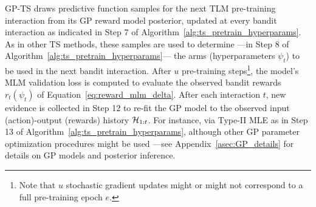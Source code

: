 GP-TS draws predictive function samples for the next TLM pre-training interaction
from its GP reward model posterior,
updated at every bandit interaction as indicated in Step 7 of Algorithm~\ref{alg:ts_pretrain_hyperparams}.
As in other TS methods, these samples are used to determine ---in Step 8 of Algorithm~\ref{alg:ts_pretrain_hyperparams}---
the arms (hyperparameters $\psi_t$) to be used in the next bandit interaction.
%
After $u$ pre-training steps\footnote{
	Note that $u$ stochastic gradient updates might or might not correspond to a full pre-training epoch $e$.
},
the model's MLM validation loss is computed
to evaluate the observed bandit rewards $r_{t}(\psi_t)$ of Equation~\eqref{eq:reward_mlm_delta}.
After each interaction $t$, new evidence is collected in Step 12
to re-fit the GP model to the observed input (action)-output (rewards) history $\mathcal{H}_{1:t}$.
For instance, via Type-II MLE as in Step 13 of Algorithm~\ref{alg:ts_pretrain_hyperparams},
although other GP parameter optimization procedures might be used
---see Appendix~\ref{asec:GP_details} for details on GP models and posterior inference.
%
